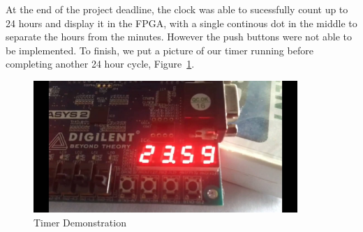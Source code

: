 At the end of the project deadline, the clock was able to sucessfully count up to 24 hours and display it in the FPGA, with a single continous dot in the middle to separate the hours from the minutes. However the push buttons were not able to be implemented. To finish, we put a picture of our timer running before completing another 24 hour cycle, Figure~\ref{fig:demo}. 

\begin{figure}[!htbp]
    \centerline{\includegraphics[width=10cm]{figures/83404584_861004010988746_2998693844775600128_n.jpg}}
    \vspace{0cm}\caption{Timer Demonstration}
    \label{fig:demo}
\end{figure}